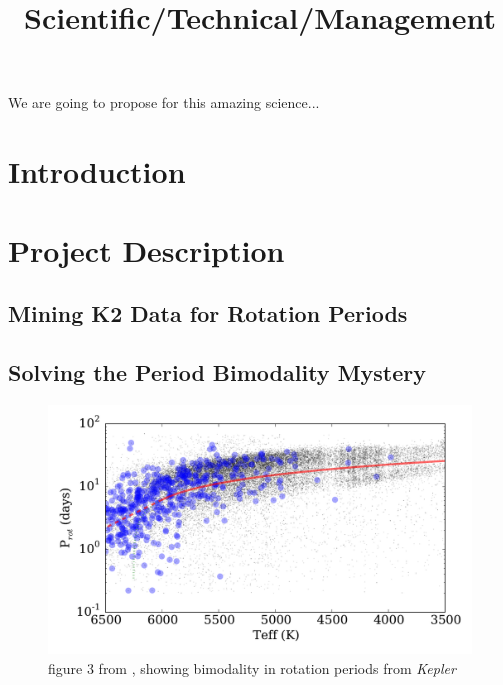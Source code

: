 \documentclass[12pt]{article}
\newcommand{\Kepler}{\textsl{Kepler}\xspace}
\begin{document}


\title{Scientific/Technical/Management}
\date{}

\maketitle

\noindent
We are going to propose for this amazing science...





\section{Introduction}


\section{Project Description}

\subsection{Mining K2 Data for Rotation Periods}

\subsection{Solving the Period Bimodality Mystery}

\begin{figure}[!th]
\centering
\includegraphics[width=5in]{davenport2016_fig3}
\caption{figure 3 from \citet{davenport2017}, showing bimodality in rotation periods from \Kepler}
\label{fig:bimodal}
\end{figure}
\end{document}

